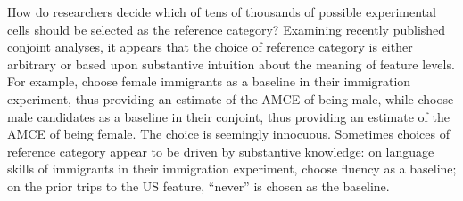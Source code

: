 \documentclass[a4paper,12pt]{article}\usepackage[]{graphicx}\usepackage[]{color}
\begin{document}
How do researchers decide which of tens of thousands of possible experimental cells should be selected as the reference category? Examining recently published conjoint analyses, it appears that the choice of reference category is either arbitrary or based upon substantive intuition about the meaning of feature levels. For example, \citet{HainmuellerHopkinsYamamoto2014} choose female immigrants as a baseline in their immigration experiment, thus providing an estimate of the AMCE of being male, while \citet{TeeleKallaRosenbluth2018} choose male candidates as a baseline in their conjoint, thus providing an estimate of the AMCE of being female. The choice is seemingly innocuous. Sometimes choices of reference category appear to be driven by substantive knowledge: on language skills of immigrants in their immigration experiment, \citet{HainmuellerHopkinsYamamoto2014} choose fluency as a baseline; on the prior trips to the US feature, ``never'' is chosen as the baseline.
\end{document}
